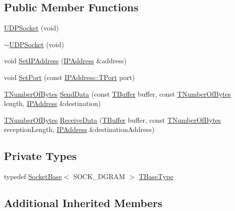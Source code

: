 \subsection*{Public Member Functions}
\begin{DoxyCompactItemize}
\item 
\hyperlink{class_u_d_p_socket_a237d16ccc7a9c4aefa81f69774748791}{U\-D\-P\-Socket} (void)
\item 
\hyperlink{class_u_d_p_socket_aa5c869eca5bab38df89f09ac79f54afb}{$\sim$\-U\-D\-P\-Socket} (void)
\item 
void \hyperlink{class_u_d_p_socket_a28960551bca2099a03ad6fa39ef28065}{Set\-I\-P\-Address} (\hyperlink{class_i_p_address}{I\-P\-Address} \&address)
\item 
void \hyperlink{class_u_d_p_socket_a13165df1eb017e8ba2eba43a06a083ec}{Set\-Port} (const \hyperlink{class_i_p_address_a51188195685c31d4258c0a078cc37154}{I\-P\-Address\-::\-T\-Port} port)
\item 
\hyperlink{class_socket_base_ac414903631491453b96e71c06c2c2e72}{T\-Number\-Of\-Bytes} \hyperlink{class_u_d_p_socket_ab78ab0104e1fafc5feb1b3459e537e32}{Send\-Data} (const \hyperlink{class_socket_base_a1557d64029a25c20b4c306b80efcc143}{T\-Buffer} buffer, const \hyperlink{class_socket_base_ac414903631491453b96e71c06c2c2e72}{T\-Number\-Of\-Bytes} length, \hyperlink{class_i_p_address}{I\-P\-Address} \&destination)
\item 
\hyperlink{class_socket_base_ac414903631491453b96e71c06c2c2e72}{T\-Number\-Of\-Bytes} \hyperlink{class_u_d_p_socket_a4f70d5a5bf2bb16fdd897355bb80741b}{Receive\-Data} (\hyperlink{class_socket_base_a1557d64029a25c20b4c306b80efcc143}{T\-Buffer} buffer, const \hyperlink{class_socket_base_ac414903631491453b96e71c06c2c2e72}{T\-Number\-Of\-Bytes} reception\-Length, \hyperlink{class_i_p_address}{I\-P\-Address} \&destination\-Address)
\end{DoxyCompactItemize}
\subsection*{Private Types}
\begin{DoxyCompactItemize}
\item 
typedef \hyperlink{class_socket_base}{Socket\-Base}$<$ S\-O\-C\-K\-\_\-\-D\-G\-R\-A\-M $>$ \hyperlink{class_u_d_p_socket_abdd3401d1e8ac4129eb799d02e6db28b}{T\-Base\-Type}
\end{DoxyCompactItemize}
\subsection*{Additional Inherited Members}


